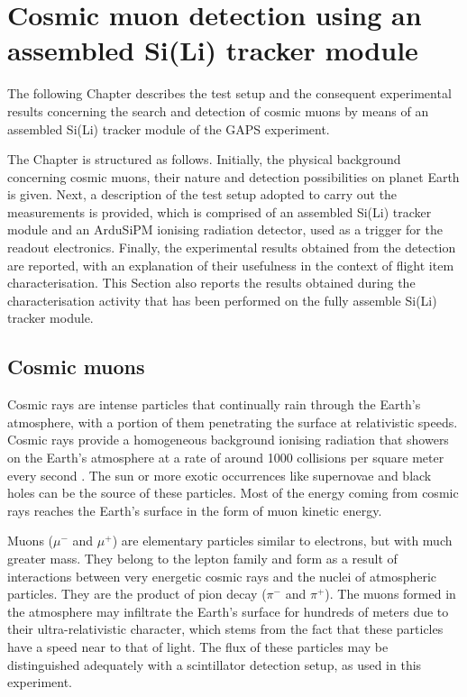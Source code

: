 \chapter{Cosmic muon detection using an assembled Si(Li) tracker module} \label{ch3}

The following Chapter describes the test setup and the consequent experimental results concerning the search and detection of cosmic muons by means of an assembled Si(Li) tracker module of the GAPS experiment.

\par
The Chapter is structured as follows. Initially, the physical background concerning cosmic muons, their nature and detection possibilities on planet Earth is given. Next, a description of the test setup adopted to carry out the measurements is provided, which is comprised of an assembled Si(Li) tracker module and an ArduSiPM ionising radiation detector, used as a trigger for the readout electronics. Finally, the experimental results obtained from the detection are reported, with an explanation of their usefulness in the context of flight item characterisation. This Section also reports the results obtained during the characterisation activity that has been performed on the fully assemble Si(Li) tracker module.


\section{Cosmic muons}

Cosmic rays are intense particles that continually rain through the Earth's atmosphere, with a portion of them penetrating the surface at relativistic speeds. Cosmic rays provide a homogeneous background ionising radiation that showers on the Earth's atmosphere at a rate of around 1000 collisions per square meter every second \cite{uretsky_1997_penetration}. The sun or more exotic occurrences like supernovae and black holes can be the source of these particles. Most of the energy coming from cosmic rays reaches the Earth's surface in the form of muon kinetic energy.

\par
Muons ($\mu^{-}$ and $\mu^{+}$) are elementary particles similar to electrons, but with much greater mass. They belong to the lepton family \cite{klapdorkleingrothaus_2018_lepton} and form as a result of interactions between very energetic cosmic rays and the nuclei of atmospheric particles. They are the product of pion decay ($\pi^{-}$ and $\pi^{+}$). The muons formed in the atmosphere may infiltrate the Earth's surface for hundreds of meters due to their ultra-relativistic character, which stems from the fact that these particles have a speed near to that of light. The flux of these particles may be distinguished adequately with a scintillator detection setup, as used in this experiment.

